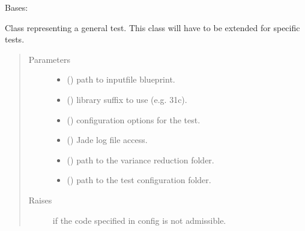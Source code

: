 \documentclass[letterpaper,10pt,english]{sphinxmanual}
\begin{document}
\begin{fulllineitems}
\label{\detokenize{api/inputgeneration:testrun.Test}}
Bases: 

Class representing a general test. This class will have to be extended
for specific tests.
\begin{quote}\begin{description}
\item[{Parameters}] \leavevmode\begin{itemize}
\item {} 
 () \textendash{} path to inputfile blueprint.

\item {} 
 () \textendash{} library suffix to use (e.g. 31c).

\item {} 
 (\sphinxstyleliteralemphasis{\sphinxupquote{ (}}\sphinxstyleliteralemphasis{\sphinxupquote{)}}) \textendash{} configuration options for the test.

\item {} 
 () \textendash{} Jade log file access.

\item {} 
 () \textendash{} path to the variance reduction folder.

\item {} 
 () \textendash{} path to the test configuration folder.

\end{itemize}

\item[{Raises}] \leavevmode
{} \textendash{} if the code specified in config is not admissible.


\end{description}
\end{quote}
\end{fulllineitems}
\end{document}
